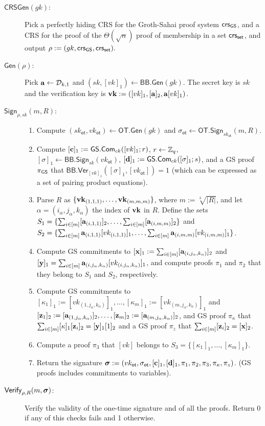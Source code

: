 \begin{description}
\item[$\mathsf{CRSGen}(gk)$:] Pick a perfectly hiding CRS for the Groth-Sahai proof system $\mathsf{crs}_{\mathsf{GS}}$, and a CRS for the proof of the $\Theta(\sqrt{n})$ proof of membership in a set $\mathsf{crs}_{\mathsf{set}}$, and output $\rho:=(gk,\mathsf{crs}_{\mathsf{GS}},\mathsf{crs}_{\mathsf{set}}).$
\item[$\mathsf{Gen}(\rho)$:] Pick $\mathbf{a}\gets\mathcal{D}_{k,1}$ and $(sk,[vk]_1)\gets\mathsf{BB}.\mathsf{Gen}(gk)$. The secret key is $sk$ and the verification key is $\mathbf{vk}:=([vk]_1,[\mathbf{a}]_2,\mathbf{a}[vk]_1)$.
\item[$\mathsf{Sign}_{\rho,sk}(m,R)$:]
\begin{enumerate}
\item Compute $(sk_\mathsf{ot},vk_\mathsf{ot})\gets\mathsf{OT}.\mathsf{Gen}(gk)$ and $\sigma_\mathsf{ot}\gets\mathsf{OT}.\mathsf{Sign}_{sk_\mathsf{ot}}(m,R)$.
\item Compute $[\mathbf{c}]_1:={\mathsf{GS}}.\mathsf{Com}_{ck}([vk]_1;r)$, $r\gets\mathbb{Z}_q$, $[\sigma]_1\gets\mathsf{BB}.\mathsf{Sign}_{sk}(vk_\mathsf{ot})$, $[\mathbf{d}]_1:={\mathsf{GS}}.\mathsf{Com}_{ck}([\sigma]_1;s)$, and a GS proof $\pi_{\mathsf{GS}}$ that $\mathsf{BB}.\mathsf{Ver}_{[vk]_1}([\sigma]_1,[vk_\mathsf{ot}])=1$ (which can be expressed as a set of pairing product equations).
\item Parse $R$ as $\{\mathbf{vk}_{(1,1,1)},\ldots,\mathbf{vk}_{(m,m,m)}\}$, where $m:=\sqrt[3]{|R|}$, and let $\alpha=(i_\alpha,j_\alpha,k_\alpha)$ the index of $\mathbf{vk}$ in $R$. Define the sets $S_1=\{\sum_{i\in[m]}[\mathbf{a}_{(i,1,1)}]_2,\allowbreak\ldots,\sum_{i\in[m]}[\mathbf{a}_{(i,m,m)}]_2\}$ and $S_2=\{\sum_{i\in[m]}\mathbf{a}_{(i,1,1)}[vk_{(i,1,1)}]_1,\allowbreak\ldots,\sum_{i\in[m]}\mathbf{a}_{(i,m,m)}[vk_{(i,m,m)}]_1\}$.
\item Compute GS commitments to $[\mathbf{x}]_1:=\sum_{i\in[m]}[\mathbf{a}_{(i,j_\alpha,k_\alpha)}]_2$ and $[\mathbf{y}]_1=\sum_{i\in[m]}\mathbf{a}_{(i,j_\alpha,k_\alpha)}[vk_{(i,j_\alpha,k_\alpha)}]_1$, and compute proofs $\pi_1$ and $\pi_2$ that they belong to $S_1$ and $S_2$, respectively.
\item Compute GS commitments to $[\kappa_1]_1:=[vk_{(1,j_\alpha,k_\alpha)}]_1,\ldots,[\kappa_m]_1:=[vk_{(m,j_\alpha,k_\alpha)}]_1$ and $[\mathbf{z}_1]_2:=[\mathbf{a}_{(1,j_\alpha,k_\alpha)}]_2,\ldots,[\mathbf{z}_m]_2:=[\mathbf{a}_{(m,j_\alpha,k_\alpha)}]_2$, and GS proof $\pi_\kappa$ that $\sum_{i\in[m]}[\kappa]_1[\mathbf{z}_i]_2=[\mathbf{y}]_1[1]_2$ and a GS proof $\pi_z$ that $\sum_{i\in[m]}[\mathbf{z}_i]_2=[\mathbf{x}]_2$.
\item Compute a proof $\pi_3$ that $[vk]$ belongs to $S_3=\{[\kappa_1]_1,\ldots,[\kappa_m]_1\}$.
\item Return the signature ${\boldsymbol \sigma}:=(vk_\mathsf{ot},\sigma_\mathsf{ot},[\mathbf{c}]_1,[\mathbf{d}]_1,\pi_1,\pi_2,\pi_3,\pi_\kappa,\pi_z)$. (GS proofs includes commitments to variables).
\end{enumerate}
\item[$\mathsf{Verify}_{\rho,R}(m,{\boldsymbol \sigma})$:] Verify the validity of the one-time signature and of all the proofs. Return 0 if any of this checks fails and 1 otherwise.
\end{description}

